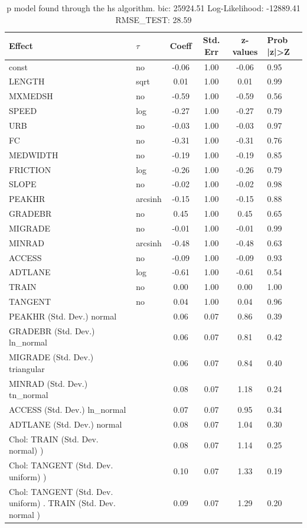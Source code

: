 \begin{table}
	\caption{p model found through the hs algorithm. bic: 25924.51 Log-Likelihood: -12889.41 RMSE_TEST: 28.59}
	\begin{center}
		\begin{tabular}{|l|l|c|c|c|l|}
			\hline
			Effect & $\tau$ & Coeff & Std. Err & z-values & Prob |z|>Z \\
			\hline
			const & no & -0.06 & 1.00 & -0.06 & 0.95 \\
			\hline
			LENGTH & sqrt & 0.01 & 1.00 & 0.01 & 0.99 \\
			\hline
			MXMEDSH & no & -0.59 & 1.00 & -0.59 & 0.56 \\
			\hline
			SPEED & log & -0.27 & 1.00 & -0.27 & 0.79 \\
			\hline
			URB & no & -0.03 & 1.00 & -0.03 & 0.97 \\
			\hline
			FC & no & -0.31 & 1.00 & -0.31 & 0.76 \\
			\hline
			MEDWIDTH & no & -0.19 & 1.00 & -0.19 & 0.85 \\
			\hline
			FRICTION & log & -0.26 & 1.00 & -0.26 & 0.79 \\
			\hline
			SLOPE & no & -0.02 & 1.00 & -0.02 & 0.98 \\
			\hline
			PEAKHR & arcsinh & -0.15 & 1.00 & -0.15 & 0.88 \\
			\hline
			GRADEBR & no & 0.45 & 1.00 & 0.45 & 0.65 \\
			\hline
			MIGRADE & no & -0.01 & 1.00 & -0.01 & 0.99 \\
			\hline
			MINRAD & arcsinh & -0.48 & 1.00 & -0.48 & 0.63 \\
			\hline
			ACCESS & no & -0.09 & 1.00 & -0.09 & 0.93 \\
			\hline
			ADTLANE & log & -0.61 & 1.00 & -0.61 & 0.54 \\
			\hline
			TRAIN & no & 0.00 & 1.00 & 0.00 & 1.00 \\
			\hline
			TANGENT & no & 0.04 & 1.00 & 0.04 & 0.96 \\
			\hline
			PEAKHR (Std. Dev.) normal &  & 0.06 & 0.07 & 0.86 & 0.39 \\
			\hline
			GRADEBR (Std. Dev.) ln_normal &  & 0.06 & 0.07 & 0.81 & 0.42 \\
			\hline
			MIGRADE (Std. Dev.) triangular &  & 0.06 & 0.07 & 0.84 & 0.40 \\
			\hline
			MINRAD (Std. Dev.) tn_normal &  & 0.08 & 0.07 & 1.18 & 0.24 \\
			\hline
			ACCESS (Std. Dev.) ln_normal &  & 0.07 & 0.07 & 0.95 & 0.34 \\
			\hline
			ADTLANE (Std. Dev.) normal &  & 0.08 & 0.07 & 1.04 & 0.30 \\
			\hline
			 Chol: TRAIN (Std. Dev. normal) ) &  & 0.08 & 0.07 & 1.14 & 0.25 \\
			\hline
			 Chol: TANGENT (Std. Dev. uniform) ) &  & 0.10 & 0.07 & 1.33 & 0.19 \\
			\hline
			 Chol: TANGENT (Std. Dev. uniform) . TRAIN (Std. Dev.   normal ) &  & 0.09 & 0.07 & 1.29 & 0.20 \\
			\hline
		\end{tabular}
	\end{center}
\end{table}
